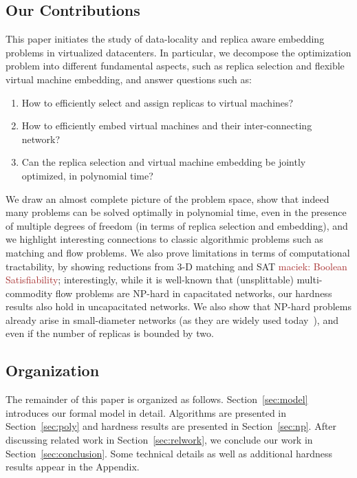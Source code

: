 \documentclass[9pt]{sigcomm-alternate}
\newcommand{\maciek}[1]{\textcolor{brown}{maciek: #1}}
\begin{document}
\subsection{Our Contributions}

This paper initiates the study of data-locality and replica aware embedding problems in virtualized datacenters.
In particular, we decompose the optimization problem into different fundamental aspects, such as
replica selection and flexible virtual machine embedding, and answer questions such as:
\begin{enumerate}
\item How to efficiently select and assign replicas to virtual machines?

\item How to efficiently embed virtual machines and their inter-connecting network?

\item Can the replica selection and virtual machine embedding be jointly optimized, in polynomial time?
\end{enumerate}

We draw an almost complete picture of the problem space, show that indeed many problems
can be solved optimally in polynomial time, even in the presence of multiple degrees of freedom (in terms of
replica selection and embedding), and
we highlight interesting connections to classic algorithmic
problems such as matching and flow problems.
We also prove limitations in terms of
computational tractability, by showing reductions from 3-D matching
and SAT \maciek{Boolean Satisfiability}; interestingly,
while it is well-known that (unsplittable) multi-commodity flow
problems are NP-hard in capacitated networks, our hardness results also hold in uncapacitated
networks. We also show that NP-hard problems already arise in small-diameter networks (as they are
widely used today~\cite{fattree}),
and even if the number of replicas is bounded by two.


\subsection{Organization}

The remainder of this paper is organized as follows.
Section~\ref{sec:model} introduces our formal model in detail.
Algorithms are presented in Section~\ref{sec:poly} and
hardness results are presented in Section~\ref{sec:np}.
After discussing related work in Section~\ref{sec:relwork},
we conclude our work in Section~\ref{sec:conclusion}.
Some technical details as well as additional hardness results
appear in the Appendix.
\end{document}
